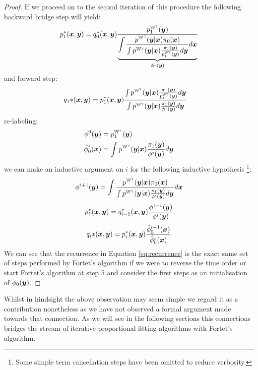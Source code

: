 \documentclass[a4paper,12pt,twoside,openright]{report}
\theoremstyle{definition}
\begin{document}
\begin{proof}
If we proceed on to the second iteration of this procedure the  following backward bridge step will yield:
\begin{align}
    p_1^{*} ({\bm{x}}, {\bm{y}}) =  q_0^{*} ({\bm{x}}, {\bm{y}}) \frac{p^{\mathbb{W}^{\gamma}}_1({\bm{y}})}{ \underbrace{\displaystyle\int \frac{p^{\mathbb{W}^{\gamma}}({\bm{y}}| {\bm{x}})\pi_0({\bm{x}})}{\int p^{\mathbb{W}^{\gamma}}({\bm{y}}| {\bm{x}}) \frac{\pi_1({\bm{y}})}{p^{\mathbb{W}^{\gamma}}_1({\bm{y}})} d{\bm{y}}}d{\bm{x}}}_{{\phi}^{1}({\bm{y}})}} 
\end{align}
and forward step:
\begin{align}
    q_1{*} ({\bm{x}}, {\bm{y}}) &= p_1^{*} ({\bm{x}}, {\bm{y}}) \frac{\int    p^{\mathbb{W}^{\gamma}}({\bm{y}}| {\bm{x}}) \frac{\pi_1({\bm{y}})}{p^{\mathbb{W}^{\gamma}}_1({\bm{y}})}  d {\bm{y}}}{\int    p^{\mathbb{W}^{\gamma}}({\bm{y}}| {\bm{x}}) \frac{\pi_1({\bm{y}})}{{\phi}^{1}({\bm{y}})}  d {\bm{y}}}
\end{align}
re-labeling: 
\begin{align}
    \phi^0({\bm{y}})&=p^{\mathbb{W}^{\gamma}}_1({\bm{y}}) \\ 
    \hat{\phi}_0^{i}({\bm{x}}) &= \int  p^{\mathbb{W}^{\gamma}}({\bm{y}}| {\bm{x}}) \frac{\pi_1({\bm{y}})}{{\phi}^{i}({\bm{y}})}  d {\bm{y}}
\end{align}
we can make an inductive argument on $i$ for the following inductive hypothesis \footnote{Some simple term cancellation steps have been omitted to reduce verbosity.}:
\begin{align} \label{eq:recurrence}
  {\phi}^{i+1}({\bm{y}}) =  \displaystyle\int \frac{p^{\mathbb{W}^{\gamma}}({\bm{y}}| {\bm{x}})\pi_0({\bm{x}})}{\int p^{\mathbb{W}^{\gamma}}({\bm{y}}| {\bm{x}}) \frac{\pi_1({\bm{y}})}{\phi^i({\bm{y}})} d{\bm{y}}}d{\bm{x}}
 \end{align}
 \begin{align}
  p_i^{*} ({\bm{x}}, {\bm{y}}) =   q_{i-1}^{*} ({\bm{x}}, {\bm{y}}) \frac{\phi^{i-1}({\bm{y}})}{{\phi}^{i}({\bm{y}})} 
\end{align}
 \begin{align}
      q_i{*} ({\bm{x}}, {\bm{y}}) =     p_i^{*} ({\bm{x}}, {\bm{y}}) \frac{\hat{\phi}_0^{i-1}({\bm{x}})}{\hat{\phi}_0^{i}({\bm{x}})} 
\end{align}
We can see that the  recurrence in Equation \ref{eq:recurrence} is the exact same set of steps performed by Fortet's algorithm if we were to reverse the time order or start Fortet's algorithm at step 5 and consider the first steps  as an initialisation of $\phi_0({\bm{y}})$.
\end{proof}

Whilst in hindsight the above observation may seem simple we regard it as a contribution nonetheless as we have not observed a formal argument made towards that connection. As we will see in the following sections this connections bridges the stream of iterative proportional fitting algorithms with Fortet's algorithm.
\end{document}

